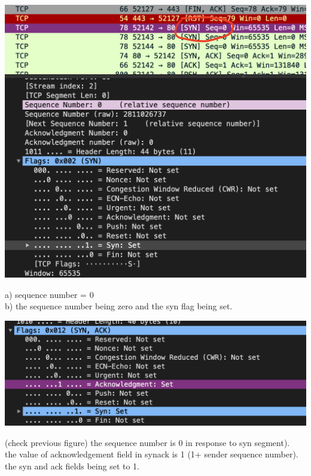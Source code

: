 {
\centering
\includegraphics[scale = 0.65]{s4} \\
\begin{latin}
a) sequence number = 0 \\
b) the sequence number being zero and the syn flag being set.
\end{latin}
}

\problem{}
{
\centering
\includegraphics[scale = 0.65]{s5} \\
\begin{latin}
(check previous figure) the sequence number is 0 in response to syn segment). \\
the value of acknowledgement field in synack is 1 (1+ sender sequence number). \\
the syn and ack fields being set to 1.
\end{latin}
}

\problem{}


